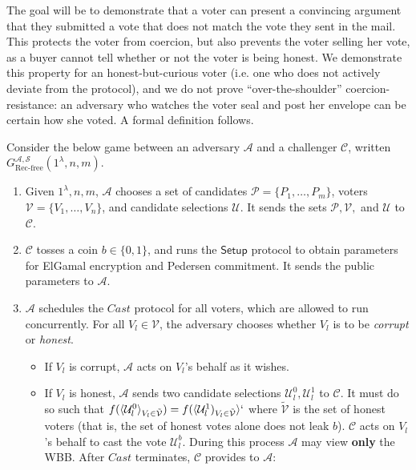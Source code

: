 \documentclass[12pt,a4paper]{article}
\theoremstyle{definition}
\begin{document}
The goal will be to demonstrate that a voter can present a convincing argument that they submitted a vote that does not match the vote they sent in the mail. This protects the voter from coercion, but also prevents the voter selling her vote, as a buyer cannot tell whether or not the voter is being honest. We demonstrate this property for an honest-but-curious voter (i.e. one who does not actively deviate from the protocol), and we do not prove ``over-the-shoulder'' coercion-resistance: an adversary who watches the voter seal and post her envelope can be certain how she voted. A formal definition follows.
\begin{definition}
    Consider the below game between an adversary $\mathcal{A}$ and a challenger $\mathcal{C}$, written $G_{\text{Rec-free}}^{\mathcal{A},\mathcal{S}}(1^\lambda, n, m)$.
    \begin{enumerate}
        \item Given $1^\lambda, n, m$, $\mathcal{A}$ chooses a set of candidates $\mathcal{P}=\{P_1,\ldots,P_m\}$, voters $\mathcal{V}=\{V_1,\ldots,V_n\}$, and candidate selections $\mathcal{U}$. It sends the sets $\mathcal{P}, \mathcal{V},$ and $\mathcal{U}$ to $\mathcal{C}$.
        \item $\mathcal{C}$ tosses a coin $b\in\{0, 1\}$, and runs the $\mathsf{Setup}$ protocol to obtain parameters for ElGamal encryption and Pedersen commitment. It sends the public parameters to $\mathcal{A}$.
        \item $\mathcal{A}$ schedules the $\mathit{Cast}$ protocol for all voters, which are allowed to run concurrently. For all $V_l\in\mathcal{V}$, the adversary chooses whether $V_l$ is to be \textit{corrupt} or \textit{honest}.
        \begin{itemize}
            \item If $V_l$ is corrupt, $\mathcal{A}$ acts on $V_l$'s behalf as it wishes.
            \item If $V_l$ is honest, $\mathcal{A}$ sends two candidate selections $\mathcal{U}_l^0, \mathcal{U}_l^1$ to $\mathcal{C}$. It must do so such that $f(\langle\mathcal{U}_l^0\rangle_{V_l\in \tilde{\mathcal{V}}})=f(\langle\mathcal{U}^1_l)_{V_l\in \tilde{\mathcal{V}}}\rangle`$ where $\tilde{\mathcal{V}}$ is the set of honest voters (that is, the set of honest votes alone does not leak $b$). $\mathcal{C}$ acts on $V_l$'s behalf to cast the vote $\mathcal{U}_l^b$. During this process $\mathcal{A}$ may view \textbf{only} the WBB. After $\mathit{Cast}$ terminates, $\mathcal{C}$ provides to $\mathcal{A}$:

\end{itemize}
\end{enumerate}
\end{definition}
\end{document}
